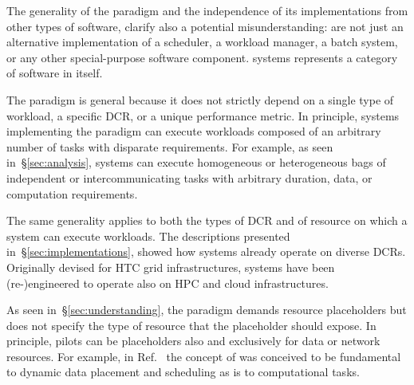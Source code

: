 \documentclass{sig-alternate}
\begin{document}
The generality of the \pilot paradigm and the independence of its
implementations from other types of software, clarify also a potential
misunderstanding: \pilots are not just an alternative implementation of a
scheduler, a workload manager, a batch system, or any other special-purpose
software component. \pilot systems represents a category of software in itself.



The \pilot paradigm is general because it does not strictly depend on a single
type of workload, a specific DCR, or a unique performance metric. In principle,
systems implementing the \pilot paradigm can execute workloads composed of an
arbitrary number of tasks with disparate requirements. For example, as seen
in~\S\ref{sec:analysis}, \pilot systems can execute homogeneous or heterogeneous
bags of independent or intercommunicating tasks with arbitrary duration, data,
or computation requirements.

The same generality applies to both the types of DCR and of resource on which a
\pilot system can execute workloads. The descriptions presented
in~\S\ref{sec:implementations}, showed how \pilot systems already operate on
diverse DCRs. Originally devised for HTC grid infrastructures, \pilot systems
have been (re-)engineered to operate also on HPC and cloud infrastructures.

As seen in~\S\ref{sec:understanding}, the \pilot paradigm demands resource
placeholders but does not specify the type of resource that the placeholder
should expose. In principle, pilots can be placeholders also and exclusively for
data or network resources. For example, in
Ref.~\cite{luckow2014pilot,santcroos2012} the concept of \pilotdata was
conceived to be fundamental to dynamic data placement and scheduling as \pilot
is to computational tasks.
\end{document}

